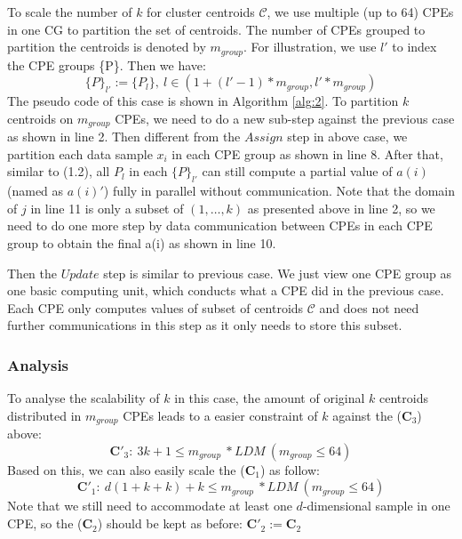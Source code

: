 \documentclass[10pt,journal,compsoc]{IEEEtran}
\begin{document}
To scale the number of $k$ for cluster centroids $\mathcal{C}$, we use multiple (up to 64) CPEs in one CG to partition the set of centroids. The number of CPEs grouped to partition the centroids is denoted by $m_{group}$. For illustration, we use $l'$ to index the CPE groups \{P\}. Then we have:
$$ \{P\}_{l'} := \{P_l\},\ l \in (1+(l'-1)*m_{group}, l'*m_{group}) $$
The pseudo code of this case is shown in Algorithm \ref{alg:2}. To partition $k$ centroids on $m_{group}$ CPEs, we need to do a new sub-step against the previous case as shown in line 2.
Then different from the $Assign$ step in above case, we partition each data sample $x_i$ in each CPE group as shown in line 8.
After that, similar to (1.2), all $P_l$ in each $\{P\}_{l'}$ can still compute a partial value of $a(i)$ (named as $a(i)'$) fully in parallel without communication.   
Note that the domain of $j$ in line 11 is only a subset of $(1,\ldots,k)$ as presented above in line 2, so we need to do one more step by data communication between CPEs in each CPE group to obtain the final a(i) as shown in line 10.

Then the $Update$ step is similar to previous case. We just view one CPE group as one basic computing unit, which conducts what a CPE did in the previous case. Each CPE only computes values of subset of centroids $\mathcal{C}$ and does not need further communications in this step as it only needs to store this subset.  

\subsubsection*{Analysis} 
To analyse the scalability of $k$ in this case, the amount of original $k$ centroids distributed in $m_{group}$ CPEs leads to a easier constraint of $k$ against the ($\mathbf{C}_3$) above: 
$$\mathbf{C'}_3:\ 3k+1 \leq m_{group}\ *LDM \ (m_{group} \leq 64) $$
Based on this, we can also easily scale the ($\mathbf{C}_1$) as follow: 
$$\mathbf{C'}_1:\ d(1+k+k)+k \leq m_{group}\ *LDM   \ (m_{group} \leq 64)$$
Note that we still need to accommodate at least one $d$-dimensional sample in one CPE, so the ($\mathbf{C}_2$) should be kept as before:
$ \mathbf{C'}_2:= \mathbf{C}_2$
\end{document}

